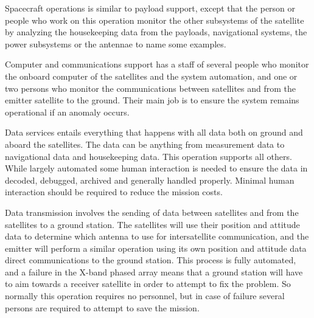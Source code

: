 Spacecraft operations is similar to payload support, except that the person or people who work on this operation monitor the other subsystems of the satellite by analyzing the housekeeping data from the payloads, navigational systems, the power subsystems or the antennae to name some examples.

Computer and communications support has a staff of several people who monitor the onboard computer of the satellites and the system automation, and one or two persons who monitor the communications between satellites and from the emitter satellite to the ground. Their main job is to ensure the system remains operational if an anomaly occurs.

Data services entails everything that happens with all data both on ground and aboard the satellites. The data can be anything from measurement data to navigational data and housekeeping data. This operation supports all others. While largely automated some human interaction is needed to ensure the data in decoded, debugged, archived and generally handled properly. Minimal human interaction should be required to reduce the mission costs.

Data transmission involves the sending of data between satellites and from the satellites to a ground station. The satellites will use their position and attitude data to determine which antenna to use for intersatellite communication, and the emitter will perform a similar operation using its own position and attitude data direct communications to the ground station. This process is fully automated, and a failure in the X-band phased array means that a ground station will have to aim towards a receiver satellite in order to attempt to fix the problem. So normally this operation requires no personnel, but in case of failure several persons are required to attempt to save the mission.